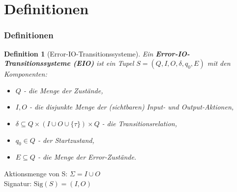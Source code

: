 \documentclass[mathserif, xcolor=dvipsnames]{beamer}
\newtheorem{Def}{Definition}
\newcommand{\EIO}{EIO}
\begin{document}
\section{Definitionen}
\begin{frame}
  \frametitle{Definitionen}
  \begin{Def}[Error-IO-Transitionssysteme]
    Ein \textbf{Error-IO-Transitionssysteme (\EIO{})} ist ein Tupel $S=(Q,I,O,\delta
    ,q_0,E)$ mit den Komponenten:
    \begin{itemize}
      \item $Q$ - die Menge der Zustände,
      \item $I,O$ - die disjunkte Menge der (sichtbaren) Input- und
        Output-Aktionen,
      \item $\delta\subseteq Q\times (I\cup O\cup \{\tau\})\times Q$ - die
        Transitionsrelation,
      \item $q_0\in Q$ - der Startzustand,
      \item $E\subseteq Q$ - die Menge der Error-Zustände.
    \end{itemize}
  \end{Def}
  Aktionsmenge von S: $\Sigma = I\cup O$\\
  Signatur: $\mathrm{Sig}(S)= (I,O)$
\end{frame}
\end{document}
